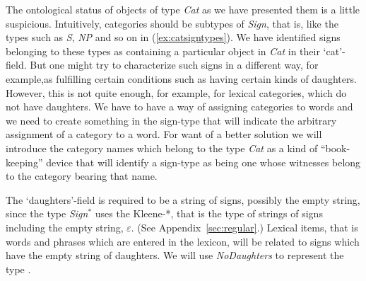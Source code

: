The ontological status of objects of type \textit{Cat} as we have
presented them is a little suspicious.  Intuitively, categories should
be subtypes of \textit{Sign}, that is, like the types such as \textit{S},
\textit{NP} and so on in (\ref{ex:catsigntypes}).  We have identified
signs belonging to these types as containing a particular object in
\textit{Cat} in their `cat'-field.  But one might try to characterize
such signs in a different way, for example,as fulfilling certain conditions
such as having  certain kinds of daughters.  However, this is not quite enough, for
example, for lexical categories, which do not have daughters.  We have
to have a way of assigning categories to words and we need to create
something in the sign-type that will indicate the arbitrary assignment
of a category to a word.  For want of a better solution we will
introduce the category names which belong to the type \textit{Cat}
as a kind of ``book-keeping'' device that will identify a sign-type as
being one whose witnesses belong to the category bearing that name.  

The `daughters'-field is required to be a string of signs, possibly
the empty string, since the type \textit{Sign}$^*$ uses the Kleene-*,
that is the type of strings of signs including the empty string,
$\varepsilon$.  (See Appendix~\ref{sec:regular}.) Lexical items, that is words and phrases which are
entered in the lexicon, will be related to signs which have the empty
string of daughters.  We will use \textit{NoDaughters} to represent
the type
.

